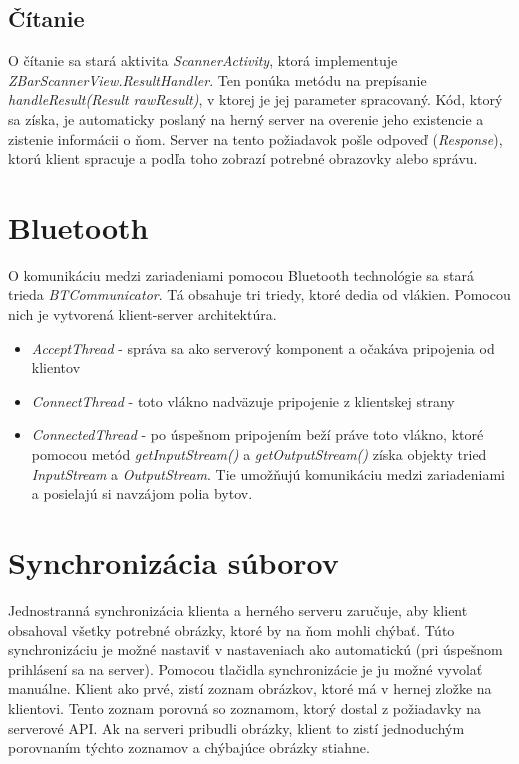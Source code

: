 \subsection{Čítanie}
O čítanie sa stará aktivita \emph{ScannerActivity}, ktorá implementuje \emph{ZBarScannerView.ResultHandler}. Ten ponúka metódu na prepísanie \emph{handleResult(Result rawResult)}, v ktorej je jej parameter spracovaný. Kód, ktorý sa získa, je automaticky poslaný na herný server na overenie jeho existencie a zistenie informácii o ňom. Server na tento požiadavok pošle odpoveď (\emph{Response}), ktorú klient spracuje a podľa toho zobrazí potrebné obrazovky alebo správu.


\section{Bluetooth}
O komunikáciu medzi zariadeniami pomocou Bluetooth technológie sa stará trieda \emph{BTCommunicator}. Tá obsahuje tri triedy, ktoré dedia od vlákien. Pomocou nich je vytvorená klient-server architektúra.
\begin{itemize}
	\item \emph{AcceptThread} - správa sa ako serverový komponent a očakáva pripojenia od klientov
    \item \emph{ConnectThread} - toto vlákno nadväzuje pripojenie z klientskej strany 
    \item \emph{ConnectedThread} - po úspešnom pripojením beží práve toto vlákno, ktoré pomocou metód \emph{getInputStream()} a \emph{getOutputStream()} získa objekty tried \emph{InputStream} a \emph{OutputStream}. Tie umožňujú komunikáciu medzi zariadeniami a posielajú si navzájom polia bytov.
\end{itemize}


\section{Synchronizácia súborov}
Jednostranná synchronizácia klienta a herného serveru zaručuje, aby klient obsahoval všetky potrebné obrázky, ktoré by na ňom mohli chýbať. Túto synchronizáciu je možné nastaviť v nastaveniach ako automatickú (pri úspešnom prihlásení sa na server). Pomocou tlačidla synchronizácie je ju možné vyvolať manuálne. Klient ako prvé, zistí zoznam obrázkov, ktoré má v hernej zložke na klientovi. Tento zoznam porovná so zoznamom, ktorý dostal z požiadavky na serverové API. Ak na serveri pribudli obrázky, klient to zistí jednoduchým porovnaním týchto zoznamov a chýbajúce obrázky stiahne.


